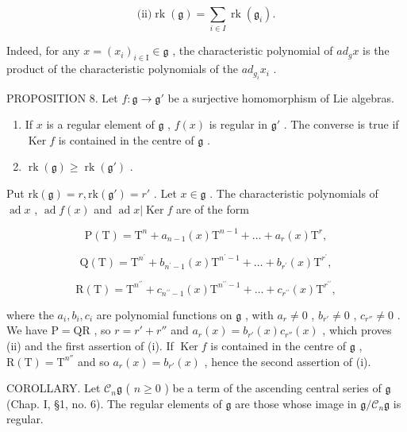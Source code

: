 \[
\text {(ii)} \operatorname{rk} (\mathfrak {g}) = \sum_ {i \in I} \operatorname{rk} (\mathfrak {g} _ {i}).
\]

Indeed, for any \(x = (x_{i})_{i \in \mathrm{I}} \in \mathfrak{g}\) , the characteristic polynomial of \(ad_{g}x\) is the product of the characteristic polynomials of the \(ad_{g_{i}}x_{i}\) .

PROPOSITION 8. Let \(f: \mathfrak{g} \to \mathfrak{g}'\) be a surjective homomorphism of Lie algebras.

\begin{enumerate}
\def\labelenumi{(\roman{enumi})}
\item
  If \(x\) is a regular element of \(\mathfrak{g}\) , \(f(x)\) is regular in \(\mathfrak{g}'\) . The converse is true if \(\operatorname{Ker} f\) is contained in the centre of \(\mathfrak{g}\) .
\item
  \(\operatorname{rk}(\mathfrak{g}) \geq \operatorname{rk}(\mathfrak{g}')\) .
\end{enumerate}

Put \(\mathrm{rk}(\mathfrak{g}) = r, \mathrm{rk}(\mathfrak{g}') = r'\) . Let \(x \in \mathfrak{g}\) . The characteristic polynomials of \(\operatorname{ad} x\) , \(\operatorname{ad} f(x)\) and \(\operatorname{ad} x|\operatorname{Ker} f\) are of the form

\[
\mathrm{P} (\mathrm{T}) = \mathrm{T} ^ {n} + a _ {n - 1} (x) \mathrm{T} ^ {n - 1} + \dots + a _ {r} (x) \mathrm{T} ^ {r},
\]

\[
\mathrm{Q} (\mathrm{T}) = \mathrm{T} ^ {n ^ {\prime}} + b _ {n ^ {\prime} - 1} (x) \mathrm{T} ^ {n ^ {\prime} - 1} + \dots + b _ {r ^ {\prime}} (x) \mathrm{T} ^ {r ^ {\prime}},
\]

\[
\mathrm{R} (\mathrm{T}) = \mathrm{T} ^ {n ^ {\prime \prime}} + c _ {n ^ {\prime \prime} - 1} (x) \mathrm{T} ^ {n ^ {\prime \prime} - 1} + \dots + c _ {r ^ {\prime \prime}} (x) \mathrm{T} ^ {r ^ {\prime \prime}},
\]

where the \(a_i, b_i, c_i\) are polynomial functions on \(\mathfrak{g}\) , with \(a_r \neq 0\) , \(b_{r'} \neq 0\) , \(c_{r''} \neq 0\) . We have \(\mathrm{P} = \mathrm{QR}\) , so \(r = r' + r''\) and \(a_r(x) = b_{r'}(x)c_{r''}(x)\) , which proves (ii) and the first assertion of (i). If \(\operatorname{Ker} f\) is contained in the centre of \(\mathfrak{g}\) , \(\mathrm{R(T)} = \mathrm{T}^{n''}\) and so \(a_r(x) = b_{r'}(x)\) , hence the second assertion of (i).

COROLLARY. Let \(\mathcal{C}_n\mathfrak{g}\) ( \(n \geq 0\) ) be a term of the ascending central series of \(\mathfrak{g}\) (Chap. I, §1, no. 6). The regular elements of \(\mathfrak{g}\) are those whose image in \(\mathfrak{g}/\mathcal{C}_n\mathfrak{g}\) is regular.

